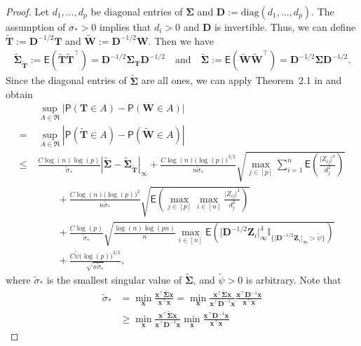 \documentclass[11pt, a4paper]{article}
\newcommand{\mbf}{\mathbf}
\renewcommand{\l}{\left}
\renewcommand{\r}{\right}
\def\wt{\widetilde}
\newcommand{\E}[0]{\mathsf{E}}
\newcommand{\p}{\mathsf{P}}
\newcommand{\nn}{\nonumber}
\theoremstyle{definition}
\theoremstyle{definition}
\theoremstyle{definition}
\theoremstyle{definition}
\theoremstyle{definition}
\theoremstyle{remark}
\theoremstyle{definition}
\theoremstyle{definition}
\theoremstyle{definition}
\begin{document}
\begin{proof}
	Let $d_1, \ldots, d_p$ be diagonal entries of $\mbf \Sigma$ and $\mbf D := \mathrm{diag} (d_1, \ldots, d_p)$. The assumption of $\sigma_* >0$ implies that $d_i >0$ and $\mbf D$ is invertible. Thus, we can define $\wt{\mbf T} := \mbf D^{-1/2}\mbf T$ and $\wt{\mbf W} := \mbf D^{-1/2}\mbf W$. Then we have 
	\begin{align*}
	\wt{\mbf \Sigma}_{\wt{\mbf T}} := \E\l(\wt{\mbf T}\wt{\mbf T}^{\top}\r) = \mbf D^{-1/2}\mbf \Sigma_{\mbf T}\mbf D^{-1/2}\quad \text{and} \quad\wt{\mbf \Sigma} := \E\l(\wt{\mbf W}\wt{\mbf W}^\top\r) = \mbf D^{-1/2}\mbf \Sigma\mbf D^{-1/2}.
	\end{align*}
	Since the diagonal entries of $\wt{\mbf \Sigma}$ are all ones, we can apply Theorem~2.1 in \citet{CCK23} and obtain
	\begin{align}\label{eq:gauss_approx}
	&\sup_{A \in \mathfrak{R}}\l\vert\p(\mbf T \in A) - \p(\mbf W \in A)\r\vert  \nn\\
	= \; &\sup_{A \in \mathfrak{R}}\l\vert\p(\wt{\mbf T} \in A) - \p(\wt{\mbf W} \in A)\r\vert\nn \\
	\le\; &\frac{C\log (n )\log (p)}{\wt\sigma_*}\l\vert\wt{\mbf \Sigma}-\wt{\mbf \Sigma}_{\wt{\mbf T}}\r\vert_{\infty} + \frac{C\log(n)\bigl(\log(p)\bigr)^{3/2}}{n\wt\sigma_*}\sqrt{\max_{j \in [p]}\sum_{i =1}^n \E\l(\frac{\vert Z_{ij}\vert^4}{d_j^2}\r)}\nn\\
	& {}\qquad + \frac{C\log(n)\bigl(\log(p)\bigr)^2}{n\wt\sigma_*}\sqrt{\E\l(\max_{j \in [p]}\max_{i \in [n]}\frac{\vert Z_{ij}\vert^4}{d_j^2}\r)}\nn\\
	& {}\qquad + \frac{C\log(p)}{\wt\sigma_*}\sqrt{\frac{\log(n)\log(pn)}{n}\max_{i \in [n]}\E\l(\vert \mbf D^{-1/2}\mbf Z_{i}\vert_{\infty}^4 \mathbb{I}_{\{\vert \mbf D^{-1/2}\mbf Z_{i}\vert_{\infty} > \wt\psi\}}\r)}\nn\\
	& {}\qquad + \frac{C\wt\psi\bigl(\log(p)\bigr)^{3/2}}{\sqrt{n\wt\sigma_*}},
	\end{align}
	where $\wt\sigma_*$ is the smallest singular value of $\wt{\mbf \Sigma}$, and $\wt\psi >0$ is arbitrary. 
	Note that 
	\begin{align*}
	\wt\sigma_* & = \min_{\mbf x}\frac{\mbf x^\top \wt{\mbf \Sigma}\mbf x}{\mbf x^\top\mbf x} = \min_{\mbf x} \frac{\mbf x^\top \wt{\mbf \Sigma}\mbf x}{\mbf x^\top\mbf D^{-1}\mbf x}\frac{\mbf x^\top\mbf D^{-1}\mbf x}{\mbf x^\top\mbf x}\\
	& \ge \min_{\mbf x} \frac{\mbf x^\top \wt{\mbf \Sigma}\mbf x}{\mbf x^\top\mbf D^{-1}\mbf x}\min_{\mbf x}\frac{\mbf x^\top\mbf D^{-1}\mbf x}{\mbf x^\top\mbf x} 

\end{align*}
\end{proof}
\end{document}
